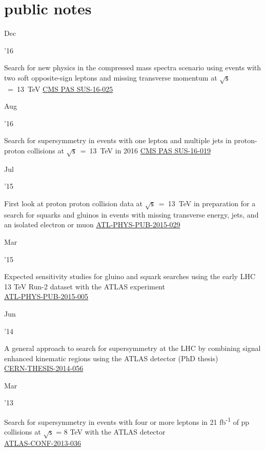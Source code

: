 \documentclass[]{cv} %
\begin{document}
\section{public notes}
\begin{entrylist}

  \entry
  {\parbox[t]{\parboxWidthOne}{Dec}\parbox[t]{\parboxWidthTwo}{\hfill '16}}
  {Search for new physics in the compressed mass spectra scenario using events with two soft opposite-sign leptons and missing transverse momentum at $\sqrt{\mathsf{s}}$~=~13~TeV}
  {\href{https://cds.cern.ch/record/2205866}{CMS PAS SUS-16-025}}
  {\vspace*{\spacingPubs}}

  \entry
  {\parbox[t]{\parboxWidthOne}{Aug}\parbox[t]{\parboxWidthTwo}{\hfill '16}}
  {Search for supersymmetry in events with one lepton and multiple jets in proton-proton collisions at $\sqrt{\mathsf{s}}$~=~13~TeV in 2016}
  {\href{https://cds.cern.ch/record/2204932}{CMS PAS SUS-16-019}}
  {\vspace*{\spacingPubs}}

  \entry
  {\parbox[t]{\parboxWidthOne}{Jul}\parbox[t]{\parboxWidthTwo}{\hfill '15}}
  {First look at proton proton collision data at $\sqrt{\mathsf{s}}$~=~13~TeV in
  preparation for a search for squarks and gluinos in events with missing
  transverse energy, jets, and an isolated electron or muon}
  {\href{https://cds.cern.ch/record/2037906}{ATL-PHYS-PUB-2015-029}}
  {\vspace*{\spacingPubs}}

  \entry
  {\parbox[t]{\parboxWidthOne}{Mar}\parbox[t]{\parboxWidthTwo}{\hfill '15}}
  {Expected sensitivity studies for gluino and squark searches using the early
  LHC 13 TeV Run-2 dataset with the ATLAS experiment\\}
  {\href{https://cds.cern.ch/record/2002608/}{ATL-PHYS-PUB-2015-005}}
  {\vspace*{\spacingPubs}}

  \entry
  {\parbox[t]{\parboxWidthOne}{Jun}\parbox[t]{\parboxWidthTwo}{\hfill '14}}
  {A general approach to search for supersymmetry at the LHC by combining signal
  enhanced kinematic regions using the ATLAS detector (PhD thesis)\\}
  {\href{https://cds.cern.ch/record/1709233/}{CERN-THESIS-2014-056}}
  {\vspace*{\spacingPubs}}

  \entry
  {\parbox[t]{\parboxWidthOne}{Mar}\parbox[t]{\parboxWidthTwo}{\hfill '13}}
  {Search for supersymmetry in events with four or more leptons in 21 fb\textsuperscript{-1} of pp collisions at
  $\sqrt{\mathsf{s}}$ = 8 TeV with the ATLAS detector\\}
  {\href{https://cds.cern.ch/record/1532429}{ATLAS-CONF-2013-036}}
  {\vspace*{\spacingPubs}}


\end{entrylist}
\end{document}
